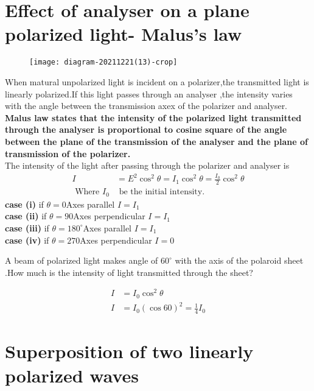          \section{Effect of analyser on a plane polarized light- Malus's law}
         \begin{figure}[H]
         	\centering
         	\texttt{[image: diagram-20211221(13)-crop]}
         	\caption{}
         	\label{}
         \end{figure}
     When matural unpolarized light is incident on a polarizer,the transmitted light is linearly polarized.If this light passes through an analyser ,the intensity varies with the angle between the transmission axex of the polarizer and analyser. \textbf{Malus law states that the intensity of the polarized light transmitted through the analyser is proportional to cosine square of the angle between the plane of the transmission of the analyser and the plane of transmission of the polarizer.}\\
     The intensity of the light after passing through the polarizer and analyser is \begin{align*}
      I&=E^2\cos^2\theta=I_1\cos^2\theta=\frac{I_0}{2}\cos^2\theta\\
    \text{ Where $I_0$}&\text{ be the initial intensity.}
     \end{align*}
     \textbf{case (i) } if $\theta=0$\quad \quad Axes parallel  \quad \quad $I=I_1$\\\textbf{case (ii) }if $\theta=90$\quad \quad Axes perpendicular \quad \quad $I=I_1$\\
 \textbf{case (iii) } if $\theta=180^{\circ}$\quad \quad Axes parallel \quad \quad $I=I_1$\\
 \textbf{case (iv) } if $\theta=270$\quad \quad Axes perpendicular  \quad \quad $I=0$
 \begin{exercise}
 	A beam of polarized light makes angle of $60^{\circ}$ with the axis of the polaroid sheet .How much is the intensity of light transmitted through the sheet?
 \end{exercise}
\begin{answer}
	\begin{align*}
	I&=I_0\cos^2\theta\\
	I&=I_0(\cos60)^2=\frac{1}{4}I_0
	\end{align*}
\end{answer}
 \section{Superposition of two linearly polarized waves}
